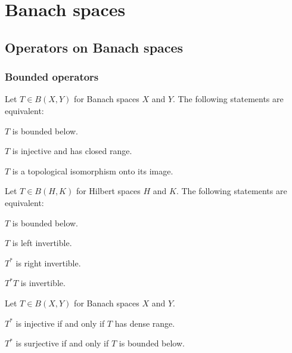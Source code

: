 \documentclass{../../large}
\begin{document}
\part{Banach spaces}




\chapter{Operators on Banach spaces}

\section{Bounded operators}
\begin{prb}
Let $T\in B(X,Y)$ for Banach spaces $X$ and $Y$.
The following statements are equivalent:
\begin{parts}
\item $T$ is bounded below.
\item $T$ is injective and has closed range.
\item $T$ is a topological isomorphism onto its image.
\end{parts}
\end{prb}

\begin{prb}
Let $T\in B(H,K)$ for Hilbert spaces $H$ and $K$.
The following statements are equivalent:
\begin{parts}
\item $T$ is bounded below.
\item $T$ is left invertible.
\item $T^*$ is right invertible.
\item $T^*T$ is invertible.
\end{parts}
\end{prb}

\begin{prb}
Let $T\in B(X,Y)$ for Banach spaces $X$ and $Y$.
\begin{parts}
\item $T^*$ is injective if and only if $T$ has dense range.
\item $T^*$ is surjective if and only if $T$ is bounded below.
\end{parts}
\end{prb}
\end{document}
